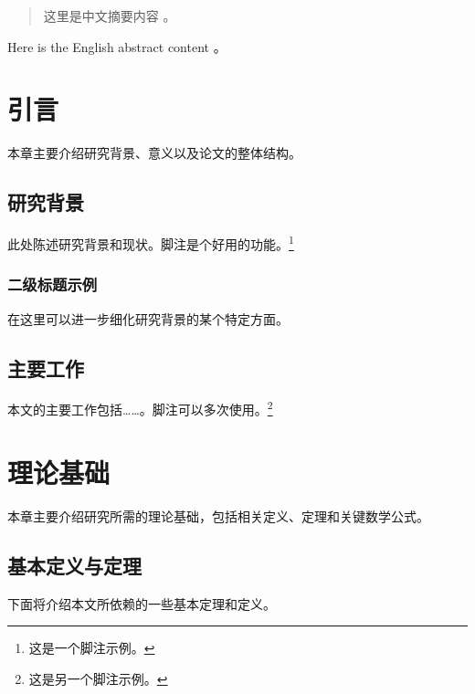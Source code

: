 \documentclass{sysuthesis}
\begin{document}
\maketitle
\frontmatter

\begin{abstract}
  这里是中文摘要内容 \cite{Knuth1984}。
\end{abstract}

\begin{abstract*}
  Here is the English abstract content \cite{Knuth1986}。
\end{abstract*}

\tableofcontents

\mainmatter

\chapter{引言}

本章主要介绍研究背景、意义以及论文的整体结构。

\section{研究背景}

此处陈述研究背景和现状。脚注是个好用的功能。\footnote{这是一个脚注示例。}

\subsection{二级标题示例}

在这里可以进一步细化研究背景的某个特定方面。

\section{主要工作}

本文的主要工作包括……。脚注可以多次使用。\footnote{这是另一个脚注示例。}

\chapter{理论基础}

本章主要介绍研究所需的理论基础，包括相关定义、定理和关键数学公式。

\section{基本定义与定理}

下面将介绍本文所依赖的一些基本定理和定义。
\end{document}
